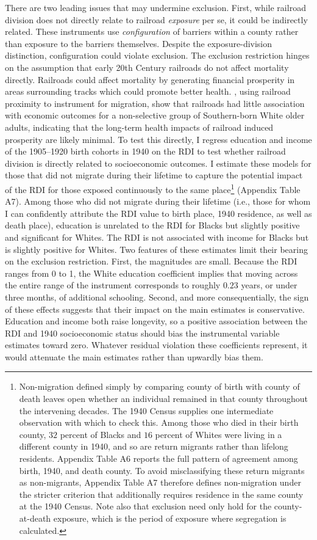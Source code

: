 \documentclass[11pt]{article}
\begin{document}
There are two leading issues that may undermine exclusion. First, while railroad division does not directly relate to railroad \textit{exposure} per se, it could be indirectly related. These instruments use \textit{configuration} of barriers within a county rather than exposure to the barriers themselves. Despite the exposure-division distinction, configuration could violate exclusion. The exclusion restriction hinges on the assumption that early 20th Century railroads do not affect mortality directly. Railroads could affect mortality by generating financial prosperity in areas surrounding tracks which could promote better health. \citet{black_impact_2015}, using railroad proximity to instrument for migration, show that railroads had little association with economic outcomes for a non-selective group of Southern-born White older adults, indicating that the long-term health impacts of railroad induced prosperity are likely minimal. To test this directly, I regress education and income of the 1905--1920 birth cohorts in 1940 on the RDI to test whether railroad division is directly related to socioeconomic outcomes. I estimate these models for those that did not migrate during their lifetime to capture the potential impact of the RDI for those exposed continuously to the same place\footnote{Non-migration defined simply by comparing county of birth with county of death leaves open whether an individual remained in that county throughout the intervening decades. The 1940 Census supplies one intermediate observation with which to check this. Among those who died in their birth county, $32$ percent of Blacks and $16$ percent of Whites were living in a different county in 1940, and so are return migrants rather than lifelong residents. Appendix Table A6 reports the full pattern of agreement among birth, 1940, and death county. To avoid misclassifying these return migrants as non-migrants, Appendix Table A7 therefore defines non-migration under the stricter criterion that additionally requires residence in the same county at the 1940 Census. Note also that exclusion need only hold for the county-at-death exposure, which is the period of exposure where segregation is calculated.} (Appendix Table A7). Among those who did not migrate during their lifetime (i.e., those for whom I can confidently attribute the RDI value to birth place, 1940 residence, as well as death place), education is unrelated to the RDI for Blacks but slightly positive and significant for Whites. The RDI is not associated with income for Blacks but is slightly positive for Whites. Two features of these estimates limit their bearing on the exclusion restriction. First, the magnitudes are small. Because the RDI ranges from 0 to 1, the White education coefficient implies that moving across the entire range of the instrument corresponds to roughly $0.23$ years, or under three months, of additional schooling. Second, and more consequentially, the sign of these effects suggests that their impact on the main estimates is conservative. Education and income both raise longevity, so a positive association between the RDI and 1940 socioeconomic status should bias the instrumental variable estimates toward zero. Whatever residual violation these coefficients represent, it would attenuate the main estimates rather than upwardly bias them.  
\end{document}
